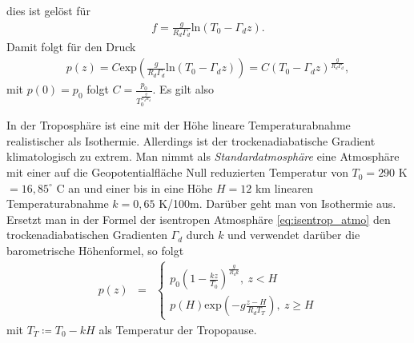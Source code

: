 \documentclass{book}
\renewcommand{\exp}{\text{exp}}
\renewcommand{\ln}{\text{ln}}
\begin{document}
%
dies ist gelöst für
%
\begin{eqnarray}
f = \frac{g}{R_d\Gamma_d}\ln\left(T_0 - \Gamma_d z\right).
\end{eqnarray}
%
Damit folgt für den Druck
%
\begin{eqnarray}
p(z) = C\exp\left(\frac{g}{R_d\Gamma_d}\ln\left(T_0 - \Gamma_d z\right)\right) = C\left(T_0 - \Gamma_d z\right)^{\frac{g}{R_d\Gamma_d}}, 
\end{eqnarray}
%
mit $p(0) = p_0$ folgt $C = \frac{p_0}{T_0^{\frac{g}{\Gamma_d R_d}}}$. Es gilt also
%
\begin{center}
\end{center}
%
In der Troposphäre ist eine mit der Höhe lineare Temperaturabnahme realistischer als Isothermie. Allerdings ist der trockenadiabatische Gradient klimatologisch zu extrem. Man nimmt als \textit{Standardatmosphäre} eine Atmosphäre mit einer auf die Geopotentialfläche Null reduzierten Temperatur von $T_0 = 290$ K $ = 16, 85^\circ$ C an und einer bis in eine Höhe $H = 12$ km linearen Temperaturabnahme $k = 0, 65$ K/100m. Darüber geht man von Isothermie aus. Ersetzt man in der Formel der isentropen Atmosphäre \eqref{eq:isentrop_atmo} den trockenadiabatischen Gradienten $\Gamma_d$ durch $k$ und verwendet darüber die barometrische Höhenformel, so folgt
%
\begin{eqnarray}
p(z) & = & \left\lbrace\begin{array}{c}
p_0\left(1 - \frac{kz}{T_0}\right)^\frac{g}{R_dk}, \:z < H\\
p(H)\exp\left(-g\frac{z - H}{R_dT_T}\right) , \:z\geq H
\end{array}\right.
\end{eqnarray}
%
mit $T_T \coloneqq T_0 - kH$ als Temperatur der Tropopause.
\end{document}
